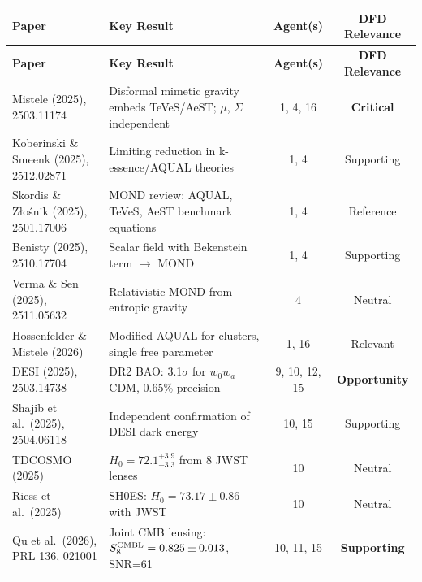 \documentclass[11pt]{article}
\newcommand{\Hzero}{H_0}
\begin{document}
\begin{longtable}{>{\raggedright}p{3cm}p{5cm}cc}
\toprule
\textbf{Paper} & \textbf{Key Result} & \textbf{Agent(s)} & \textbf{DFD Relevance} \\
\midrule
\endfirsthead
\toprule
\textbf{Paper} & \textbf{Key Result} & \textbf{Agent(s)} & \textbf{DFD Relevance} \\
\midrule
\endhead

Mistele (2025), 2503.11174 &
Disformal mimetic gravity embeds TeVeS/AeST; $\mu$, $\Sigma$ independent &
1, 4, 16 &
\textbf{Critical} \\

Koberinski \& Smeenk (2025), 2512.02871 &
Limiting reduction in k-essence/AQUAL theories &
1, 4 &
Supporting \\

Skordis \& Z\l{}o\'snik (2025), 2501.17006 &
MOND review: AQUAL, TeVeS, AeST benchmark equations &
1, 4 &
Reference \\

Benisty (2025), 2510.17704 &
Scalar field with Bekenstein term $\to$ MOND &
1, 4 &
Supporting \\

Verma \& Sen (2025), 2511.05632 &
Relativistic MOND from entropic gravity &
4 &
Neutral \\

Hossenfelder \& Mistele (2026) &
Modified AQUAL for clusters, single free parameter &
1, 16 &
Relevant \\

\midrule

DESI (2025), 2503.14738 &
DR2 BAO: 3.1$\sigma$ for $w_0w_a$CDM, 0.65\% precision &
9, 10, 12, 15 &
\textbf{Opportunity} \\

Shajib et al.\ (2025), 2504.06118 &
Independent confirmation of DESI dark energy &
10, 15 &
Supporting \\

TDCOSMO (2025) &
$\Hzero = 72.1^{+3.9}_{-3.3}$ from 8 JWST lenses &
10 &
Neutral \\

Riess et al.\ (2025) &
SH0ES: $\Hzero = 73.17 \pm 0.86$ with JWST &
10 &
Neutral \\

\midrule

Qu et al.\ (2026), PRL 136, 021001 &
Joint CMB lensing: $S_8^{\rm CMBL} = 0.825 \pm 0.013$, SNR=61 &
10, 11, 15 &
\textbf{Supporting} \\


\end{longtable}
\end{document}
